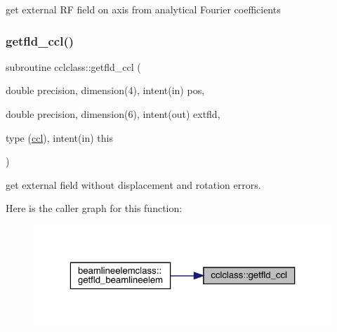 get external RF field on axis from analytical Fourier coefficients 

\mbox{\label{namespacecclclass_a6c8d8825e6d50c30ba91c90892619a5b}} 
\subsubsection{\texorpdfstring{getfld\_ccl()}{getfld\_ccl()}}
{\footnotesize\ttfamily subroutine cclclass\+::getfld\+\_\+ccl (\begin{DoxyParamCaption}\item[{double precision, dimension(4), intent(in)}]{pos,  }\item[{double precision, dimension(6), intent(out)}]{extfld,  }\item[{type (\mbox{\hyperlink{namespacecclclass_structcclclass_1_1ccl}{ccl}}), intent(in)}]{this }\end{DoxyParamCaption})}



get external field without displacement and rotation errors. 

Here is the caller graph for this function\+:\nopagebreak
\begin{figure}[H]
\begin{center}
\leavevmode
\includegraphics[width=323pt]{namespacecclclass_a6c8d8825e6d50c30ba91c90892619a5b_icgraph}
\end{center}
\end{figure}
\mbox{\label{namespacecclclass_a4d8386891ff89c7352f001b01d5f84b5}} 
